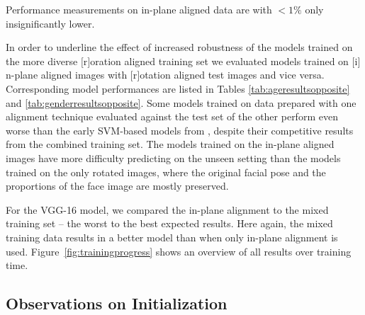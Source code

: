 \documentclass[10pt,twocolumn,letterpaper]{article}
\begin{document}
Performance measurements on in-plane aligned data are with $<1\%$ only insignificantly lower.


In order to underline the effect of increased robustness of the models trained on the more diverse $[$r$]$oration aligned training set we evaluated models trained on $[$i$]$n-plane aligned images with $[$r$]$otation aligned test images and vice versa. Corresponding model performances are listed in Tables \ref{tab:ageresultsopposite} and \ref{tab:genderresultsopposite}.
Some models trained on data prepared with one alignment technique evaluated against the test set of the other perform even worse than the early SVM-based models from \cite{eidinger2014age}, despite their competitive results from the combined training set.
The models trained on the
in-plane aligned images have more difficulty predicting on the unseen setting than the models trained on the only rotated images, where the original facial pose and the proportions of the face image are mostly preserved.

For the VGG-16 model, we compared the in-plane alignment to the mixed training set -- the worst to the best expected results. Here again, the mixed training data results in a better model than when only in-plane alignment is used.
Figure~\ref{fig:trainingprogress} shows an overview of all results over training time.

\subsection{Observations on Initialization}
\end{document}
